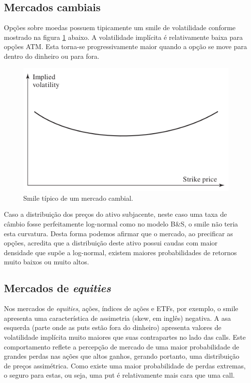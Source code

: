 \documentclass[]{book}
\begin{document}
\subsection{Mercados cambiais}\label{mercados-cambiais}

Opções sobre moedas possuem tipicamente um smile de volatilidade
conforme mostrado na figura \ref{fig:smile-cambial} abaixo. A
volatilidade implícita é relativamente baixa para opções ATM. Esta
torna-se progressivamente maior quando a opção se move para dentro do
dinheiro ou para fora.

\begin{figure}
\centering
\includegraphics{./images/smile_cambial.png}
\caption{\label{fig:smile-cambial}Smile típico de um mercado cambial.}
\end{figure}

Caso a distribuição dos preços do ativo subjacente, neste caso uma taxa
de câmbio fosse perfeitamente log-normal como no modelo B\&S, o smile
não teria esta curvatura. Desta forma podemos afirmar que o mercado, ao
precificar as opções, acredita que a distribuição deste ativo possui
caudas com maior densidade que supõe a log-normal, existem maiores
probabilidades de retornos muito baixos ou muito altos.

\subsection{\texorpdfstring{Mercados de
\emph{equities}}{Mercados de equities}}\label{mercados-de-equities}

Nos mercados de \emph{equities}, ações, índices de ações e ETFs, por
exemplo, o smile apresenta uma característica de assimetria (skew, em
inglês) negativa. A asa esquerda (parte onde as puts estão fora do
dinheiro) apresenta valores de volatilidade implícita muito maiores que
suas contrapartes no lado das calls. Este comportamento reflete a
percepção de mercado de uma maior probabilidade de grandes perdas nas
ações que altos ganhos, gerando portanto, uma distribuição de preços
assimétrica. Como existe uma maior probabilidade de perdas extremas, o
seguro para estas, ou seja, uma put é relativamente mais cara que uma
call.
\end{document}
